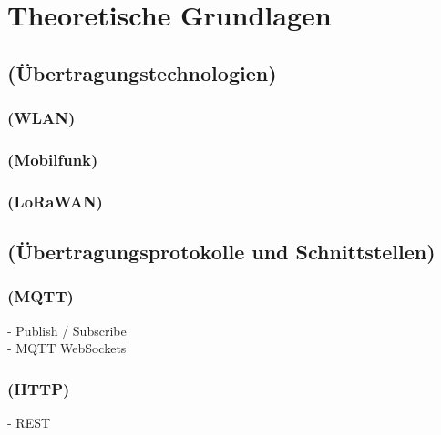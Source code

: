 \chapter{Theoretische Grundlagen}\label{ch:Theoretische Grundlagen}
\section{(Übertragungstechnologien)}\label{sec:(Übertragungstechnologien)}
\subsection{(WLAN)}\label{subsec:(WLAN)}
\subsection{(Mobilfunk)}\label{subsec:(Mobilfunk)}
\subsection{(LoRaWAN)}\label{subsec:(LoRaWAN)}
\section{(Übertragungsprotokolle und Schnittstellen)}\label{sec:(Übertragungsprotokolle und Schnittstellen)}
\subsection{(MQTT)}\label{subsec:(MQTT)}
- Publish / Subscribe\\
- MQTT WebSockets\\
\subsection{(HTTP)}\label{subsec:(HTTP)}
- REST\\
